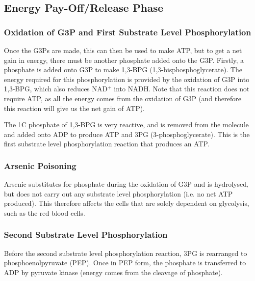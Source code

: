 \begin{center}
\end{center}

\subsection{Energy Pay-Off/Release Phase}

\subsubsection{Oxidation of G3P and First Substrate Level Phosphorylation}

Once the G3Ps are made, this can then be used to make ATP, but to get a net gain in energy, there must be another phosphate added onto the G3P.
Firstly, a phosphate is added onto G3P to make 1,3-BPG (1,3-bisphosphoglycerate).
The energy required for this phosphorylation is provided by the oxidation of G3P into 1,3-BPG, which also reduces NAD$^+$ into NADH.
Note that this reaction does not require ATP, as all the energy comes from the oxidation of G3P (and therefore this reaction will give us the net gain of ATP).

The 1C phosphate of 1,3-BPG is very reactive, and is removed from the molecule and added onto ADP to produce ATP and 3PG (3-phosphoglycerate).
This is the first substrate level phosphorylation reaction that produces an ATP.

\subsubsection{Arsenic Poisoning}

Arsenic substitutes for phosphate during the oxidation of G3P and is hydrolysed, but does not carry out any substrate level phosphorylation (i.e. no net ATP produced).
This therefore affects the cells that are solely dependent on glycolysis, such as the red blood cells.

\subsubsection{Second Substrate Level Phosphorylation}

Before the second substrate level phosphorylation reaction, 3PG is rearranged to phosphoenolpyruvate (PEP).
Once in PEP form, the phosphate is transferred to ADP by pyruvate kinase (energy comes from the cleavage of phosphate).

